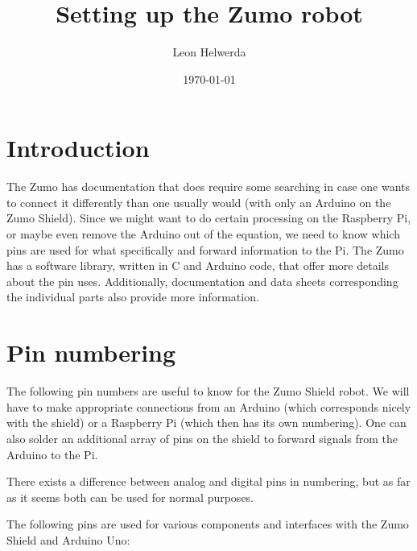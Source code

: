 \documentclass{article}
\begin{document}
\title{Setting up the Zumo robot}
\author{Leon Helwerda}
\date{\today}

\maketitle

\section{Introduction}

The Zumo has documentation that does require some searching in case one wants 
to connect it differently than one usually would (with only an Arduino on the 
Zumo Shield). Since we might want to do certain processing on the Raspberry Pi, 
or maybe even remove the Arduino out of the equation, we need to know which 
pins are used for what specifically and forward information to the Pi. The Zumo 
has a software library, written in C and Arduino code, that offer more details 
about the pin uses. Additionally, documentation and data sheets corresponding 
the individual parts also provide more information.

\section{Pin numbering}
The following pin numbers are useful to know for the Zumo Shield robot. We will 
have to make appropriate connections from an Arduino (which corresponds nicely 
with the shield) or a Raspberry Pi (which then has its own numbering). One can 
also solder an additional array of pins on the shield to forward signals from 
the Arduino to the Pi.

There exists a difference between analog and digital pins in numbering, but as 
far as it seems both can be used for normal purposes.

The following pins are used for various components and interfaces with the Zumo 
Shield and Arduino Uno:
\end{document}
